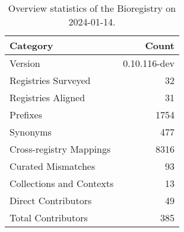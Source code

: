 \begin{table}
\caption{Overview statistics of the Bioregistry on 2024-01-14.}
\label{tab:bioregistry-summary}
\begin{tabular}{lr}
\toprule
Category & Count \\
\midrule
Version & 0.10.116-dev \\
Registries Surveyed & 32 \\
Registries Aligned & 31 \\
Prefixes & 1754 \\
Synonyms & 477 \\
Cross-registry Mappings & 8316 \\
Curated Mismatches & 93 \\
Collections and Contexts & 13 \\
Direct Contributors & 49 \\
Total Contributors & 385 \\
\bottomrule
\end{tabular}
\end{table}
